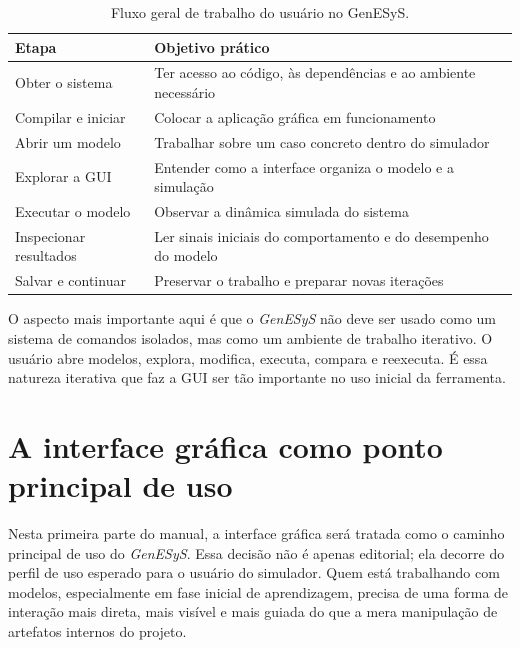 \begin{table}[htbp]
    \centering
    \caption{Fluxo geral de trabalho do usuário no GenESyS.}
    \label{tab:cap1_fluxo_usuario}
    \small
    \begin{tabular}{|p{4.0cm}|p{7.4cm}|}
        \hline
        \textbf{Etapa} & \textbf{Objetivo prático} \\
        \hline
        Obter o sistema & Ter acesso ao código, às dependências e ao ambiente necessário \\
        \hline
        Compilar e iniciar & Colocar a aplicação gráfica em funcionamento \\
        \hline
        Abrir um modelo & Trabalhar sobre um caso concreto dentro do simulador \\
        \hline
        Explorar a GUI & Entender como a interface organiza o modelo e a simulação \\
        \hline
        Executar o modelo & Observar a dinâmica simulada do sistema \\
        \hline
        Inspecionar resultados & Ler sinais iniciais do comportamento e do desempenho do modelo \\
        \hline
        Salvar e continuar & Preservar o trabalho e preparar novas iterações \\
        \hline
    \end{tabular}
\end{table}

O aspecto mais importante aqui é que o \textit{GenESyS} não deve ser usado como um sistema de comandos isolados, mas como um ambiente de trabalho iterativo. O usuário abre modelos, explora, modifica, executa, compara e reexecuta. É essa natureza iterativa que faz a GUI ser tão importante no uso inicial da ferramenta.

\section{A interface gráfica como ponto principal de uso}
\label{sec:cap1_gui_ponto_principal}

Nesta primeira parte do manual, a interface gráfica será tratada como o caminho principal de uso do \textit{GenESyS}. Essa decisão não é apenas editorial; ela decorre do perfil de uso esperado para o usuário do simulador. Quem está trabalhando com modelos, especialmente em fase inicial de aprendizagem, precisa de uma forma de interação mais direta, mais visível e mais guiada do que a mera manipulação de artefatos internos do projeto.

